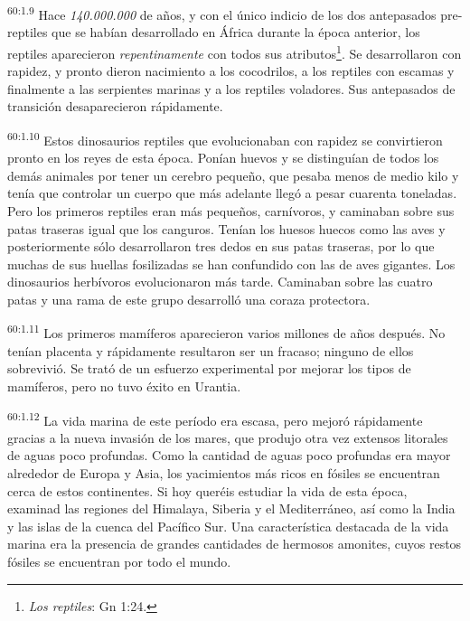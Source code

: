 \par
\textsuperscript{60:1.9} Hace \textit{140.000.000} de años, y con el único indicio de los dos antepasados pre-reptiles que se habían desarrollado en África durante la época anterior, los reptiles aparecieron \textit{repentinamente} con todos sus atributos\footnote{\textit{Los reptiles}: Gn 1:24.}. Se desarrollaron con rapidez, y pronto dieron nacimiento a los cocodrilos, a los reptiles con escamas y finalmente a las serpientes marinas y a los reptiles voladores. Sus antepasados de transición desaparecieron rápidamente.

\par
\textsuperscript{60:1.10} Estos dinosaurios reptiles que evolucionaban con rapidez se convirtieron pronto en los reyes de esta época. Ponían huevos y se distinguían de todos los demás animales por tener un cerebro pequeño, que pesaba menos de medio kilo y tenía que controlar un cuerpo que más adelante llegó a pesar cuarenta toneladas. Pero los primeros reptiles eran más pequeños, carnívoros, y caminaban sobre sus patas traseras igual que los canguros. Tenían los huesos huecos como las aves y posteriormente sólo desarrollaron tres dedos en sus patas traseras, por lo que muchas de sus huellas fosilizadas se han confundido con las de aves gigantes. Los dinosaurios herbívoros evolucionaron más tarde. Caminaban sobre las cuatro patas y una rama de este grupo desarrolló una coraza protectora.

\par
\textsuperscript{60:1.11} Los primeros mamíferos aparecieron varios millones de años después. No tenían placenta y rápidamente resultaron ser un fracaso; ninguno de ellos sobrevivió. Se trató de un esfuerzo experimental por mejorar los tipos de mamíferos, pero no tuvo éxito en Urantia.

\par
\textsuperscript{60:1.12} La vida marina de este período era escasa, pero mejoró rápidamente gracias a la nueva invasión de los mares, que produjo otra vez extensos litorales de aguas poco profundas. Como la cantidad de aguas poco profundas era mayor alrededor de Europa y Asia, los yacimientos más ricos en fósiles se encuentran cerca de estos continentes. Si hoy queréis estudiar la vida de esta época, examinad las regiones del Himalaya, Siberia y el Mediterráneo, así como la India y las islas de la cuenca del Pacífico Sur. Una característica destacada de la vida marina era la presencia de grandes cantidades de hermosos amonites, cuyos restos fósiles se encuentran por todo el mundo.

